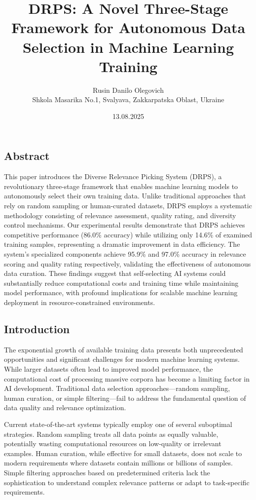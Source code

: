 \documentclass[12pt]{article}
\title{DRPS: A Novel Three-Stage Framework for Autonomous Data Selection in Machine Learning Training}
\author{Rusin Danilo Olegovich\\Shkola Masarika No.1, Svalyava, Zakkarpatska Oblast, Ukraine}
\date{13.08.2025}
\begin{document}
\maketitle

\subsection{Abstract}\label{abstract}

This paper introduces the Diverse Relevance Picking System (DRPS), a revolutionary three-stage framework that enables machine learning models to autonomously select their own training data. Unlike traditional approaches that rely on random sampling or human-curated datasets, DRPS employs a systematic methodology consisting of relevance assessment, quality rating, and diversity control mechanisms. Our experimental results demonstrate that DRPS achieves competitive performance (86.0\% accuracy) while utilizing only 14.6\% of examined training samples, representing a dramatic improvement in data efficiency. The system's specialized components achieve 95.9\% and 97.0\% accuracy in relevance scoring and quality rating respectively, validating the effectiveness of autonomous data curation. These findings suggest that self-selecting AI systems could substantially reduce computational costs and training time while maintaining model performance, with profound implications for scalable machine learning deployment in resource-constrained environments.

\subsection{Introduction}\label{introduction}

The exponential growth of available training data presents both unprecedented opportunities and significant challenges for modern machine learning systems. While larger datasets often lead to improved model performance, the computational cost of processing massive corpora has become a limiting factor in AI development. Traditional data selection approaches—random sampling, human curation, or simple filtering—fail to address the fundamental question of data quality and relevance optimization.

Current state-of-the-art systems typically employ one of several suboptimal strategies. Random sampling treats all data points as equally valuable, potentially wasting computational resources on low-quality or irrelevant examples. Human curation, while effective for small datasets, does not scale to modern requirements where datasets contain millions or billions of samples. Simple filtering approaches based on predetermined criteria lack the sophistication to understand complex relevance patterns or adapt to task-specific requirements.
\end{document}
